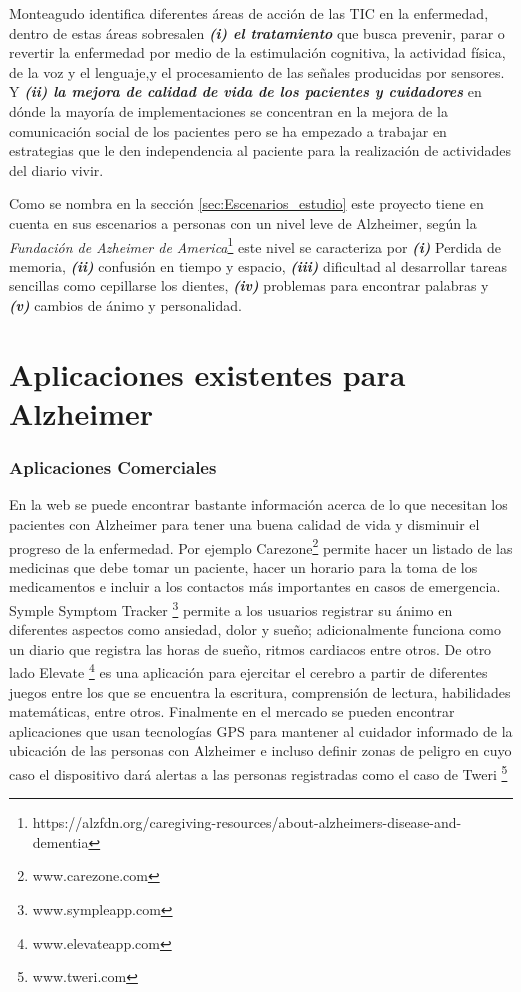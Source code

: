 Monteagudo \cite{monteagudo2014capacidades} identifica diferentes áreas de acción de las TIC en la enfermedad, dentro de estas áreas sobresalen \textbf{\textit{(i) el tratamiento}} que busca prevenir, parar o revertir la enfermedad por medio de la estimulación cognitiva, la actividad física, de la voz y el lenguaje,y el procesamiento de las señales producidas por sensores. Y \textbf{\textit{(ii) la mejora de calidad de vida de los pacientes y cuidadores}} en dónde la mayoría de implementaciones se concentran en la mejora de la comunicación social de los pacientes pero se ha empezado a trabajar en estrategias que le den independencia al paciente para la realización de actividades del diario vivir.

Como se nombra en la sección \ref{sec:Escenarios_estudio} este proyecto tiene en cuenta en sus escenarios a personas con un nivel leve de Alzheimer, según la \textit{Fundación de Azheimer de America}\footnote{https://alzfdn.org/caregiving-resources/about-alzheimers-disease-and-dementia} este nivel se caracteriza por \textbf{\textit{(i)}} Perdida de memoria, \textbf{\textit{(ii)}} confusión en tiempo y espacio, \textbf{\textit{(iii)}} dificultad al desarrollar tareas sencillas como cepillarse los dientes, \textbf{\textit{(iv)}} problemas para encontrar palabras y \textbf{\textit{(v)}} cambios de ánimo y personalidad. 


\section{Aplicaciones existentes para Alzheimer}
\label{sec:CS_Aplicaciones}

\subsubsection{Aplicaciones Comerciales}

En la web se puede encontrar bastante información acerca de lo que necesitan los pacientes con Alzheimer para tener una buena calidad de vida y disminuir el progreso de la enfermedad. Por ejemplo Carezone\footnote{www.carezone.com} permite hacer un listado de las medicinas que debe tomar un paciente, hacer un horario para la toma de los medicamentos e incluir a los contactos más importantes en casos de emergencia. Symple Symptom Tracker \footnote{www.sympleapp.com} permite a los usuarios registrar su ánimo en diferentes aspectos como ansiedad, dolor y sueño; adicionalmente funciona como un diario que registra las horas de sueño, ritmos cardiacos entre otros. De otro lado Elevate \footnote{www.elevateapp.com} es una aplicación para ejercitar el cerebro a partir de diferentes juegos entre los que se encuentra la escritura, comprensión de lectura, habilidades matemáticas, entre otros. Finalmente en el mercado se pueden encontrar aplicaciones que usan tecnologías GPS para mantener al cuidador informado de la ubicación de las personas con Alzheimer e incluso definir zonas de peligro en cuyo caso el dispositivo dará alertas a las personas registradas como el caso de Tweri \footnote{www.tweri.com}

